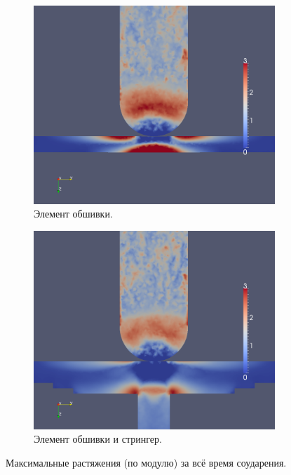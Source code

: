 \begin{figure}[htp]
\begin{subfigure}[b]{0.5\textwidth}
\centering
\includegraphics[width=\textwidth]{png/pkm-experiment/wing-only/tension.png}
\caption{Элемент обшивки.}
\end{subfigure}
\begin{subfigure}[b]{0.5\textwidth}
\centering
\includegraphics[width=\textwidth]{png/pkm-experiment/wing-stringer/tension.png}
\caption{Элемент обшивки и стрингер.}
\end{subfigure}
\caption{Максимальные растяжения (по модулю) за всё время соударения.}
\label{pic:pkm_experiment_tension}
\end{figure}

